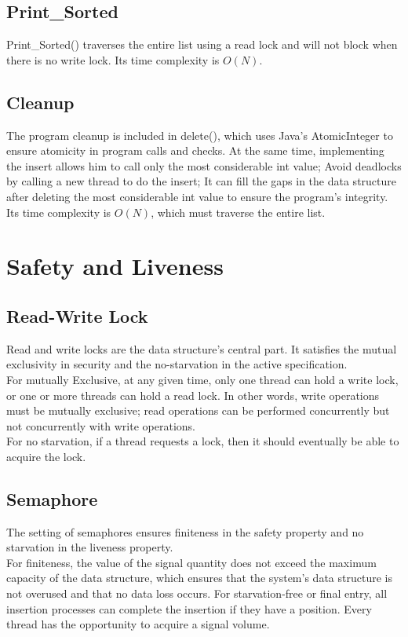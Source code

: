 \subsection{Print\_Sorted}
\label{sec:print_sorted}
Print\_Sorted() traverses the entire list using a read lock and will not block when there is no write lock. Its time complexity is $O(N)$.

\subsection{Cleanup}
\label{sec:cleanup}
The program cleanup is included in delete(), which uses Java's AtomicInteger to ensure atomicity in program calls and checks. At the same time, implementing the insert allows him to call only the most considerable int value; Avoid deadlocks by calling a new thread to do the insert; It can fill the gaps in the data structure after deleting the most considerable int value to ensure the program's integrity.\vspace{8pt}\\
Its time complexity is $O(N)$, which must traverse the entire list.

\section{Safety and Liveness}
\label{chap:safety and liveness}
\subsection{Read-Write Lock}
\label{sec:Read and write locks}
Read and write locks are the data structure's central part. It satisfies the mutual exclusivity in security and the no-starvation in the active specification.\vspace{8pt}\\
For mutually Exclusive, at any given time, only one thread can hold a write lock, or one or more threads can hold a read lock. In other words, write operations must be mutually exclusive; read operations can be performed concurrently but not concurrently with write operations.\vspace{8pt}\\
For no starvation, if a thread requests a lock, then it should eventually be able to acquire the lock.
\subsection{Semaphore}
\label{sec:Semaphore}
The setting of semaphores ensures finiteness in the safety property and no starvation in the liveness property.\vspace{8pt}\\
For finiteness, the value of the signal quantity does not exceed the maximum capacity of the data structure, which ensures that the system's data structure is not overused and that no data loss occurs.
For starvation-free or final entry, all insertion processes can complete the insertion if they have a position. Every thread has the opportunity to acquire a signal volume.
